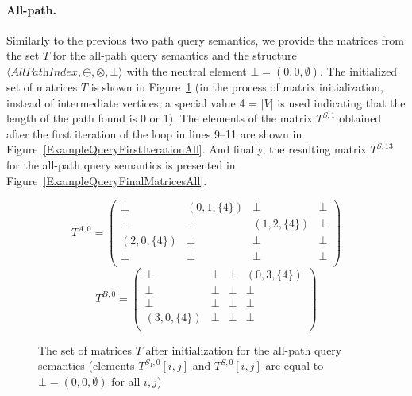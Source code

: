 \paragraph{All-path.} %
Similarly to the previous two path query semantics, we provide the matrices from the set $T$ for the all-path query semantics and the structure $\langle \textit{AllPathIndex}, \oplus, \otimes, \bot \rangle$ with the neutral element $\bot = (0, 0, \emptyset)$. The initialized set of matrices $T$ is shown in Figure~\ref{ExampleQueryInitMatrixAll} (in the process of matrix initialization, instead of intermediate vertices, a special value 4 = $|V|$ is used indicating that the length of the path found is 0 or 1). The elements of the matrix $T^{S, 1}$ obtained after the first iteration of the loop in lines 9--11 are shown in Figure~\ref{ExampleQueryFirstIterationAll}. And finally, the resulting matrix $T^{S, 13}$ for the all-path query semantics is presented in Figure~\ref{ExampleQueryFinalMatricesAll}.

{\small
	\begin{figure}[h]
		\[
		T^{A, 0} = \begin{pmatrix}
			\bot & (0, 1, \{4\})       & \bot & \bot       \\
			\bot & \bot & (1, 2, \{4\})       & \bot \\
			(2, 0, \{4\})       & \bot & \bot & \bot \\
			\bot       & \bot & \bot & \bot \\
		\end{pmatrix}
		\]
		\[
		T^{B, 0} = \begin{pmatrix}
			\bot & \bot       & \bot & (0, 3, \{4\})       \\
			\bot & \bot & \bot       & \bot \\
			\bot       & \bot & \bot & \bot \\
			(3, 0, \{4\})      & \bot & \bot & \bot \\
		\end{pmatrix}
		\]
		\caption{The set of matrices $T$ after initialization for the all-path query semantics (elements $T^{S_1, 0}[i, j]$ and $T^{S, 0}[i, j]$ are equal to $\bot = (0, 0, \emptyset)$ for all $i, j$)}
		\label{ExampleQueryInitMatrixAll}
	\end{figure}
}

